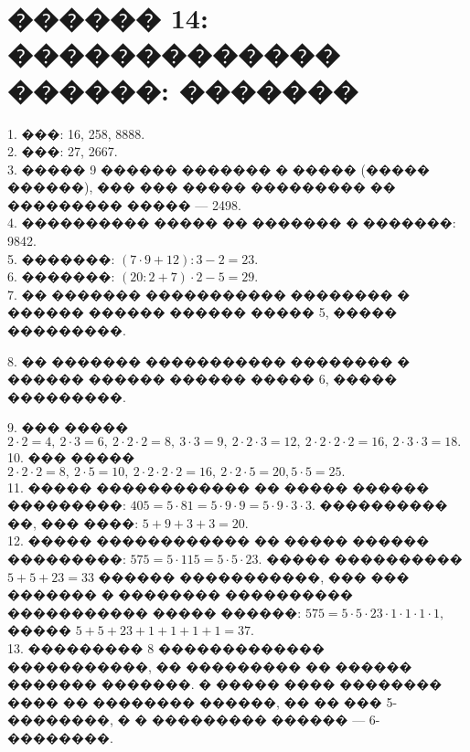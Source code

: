 \documentclass[12pt]{article}
\begin{document}
\section{������ 14: ������������� ������: �������}
1. ���: 16, 258, 8888.\\
2. ���: 27, 2667.\\
3. ����� 9 ������ ������� � ����� (����� ������), ��� ��� ����� ��������� �� ��������� ����� --- 2498.\\
4. ���������� ����� �� ������� � �������: 9842.\\
5. �������: $(7\cdot9+12):3-2=23.$\\
6. �������: $(20:2+7)\cdot2-5=29.$\\
7. �� ������� ����������� �������� � ������ ������ ������ ����� 5, ����� ���������.
\begin{center}
\begin{figure}[h!]
\end{figure}
\end{center}
8. �� ������� ����������� �������� � ������ ������ ������ ����� 6, ����� ���������.
\begin{center}
\begin{figure}[h!]
\end{figure}
\end{center}
9. ��� ����� $2\cdot2=4,\ 2\cdot3=6,\ 2\cdot2\cdot2=8,\ 3\cdot3=9,\ 2\cdot2\cdot3=12,\ 2\cdot2\cdot2\cdot2=16,\ 2\cdot3\cdot3=18.$\\
10. ��� ����� $2\cdot2\cdot2=8,\ 2\cdot5=10,\ 2\cdot2\cdot2\cdot2=16,\ 2\cdot2\cdot5=20, 5\cdot5=25.$\\
11. ����� ������������ �� ����� ������ ���������: $405=5\cdot81=5\cdot9\cdot9=5\cdot9\cdot3\cdot3.$ ���������� ��, ��� ����: $5+9+3+3=20.$\\
12. ����� ������������ �� ����� ������ ���������: $575=5\cdot115=5\cdot5\cdot23.$ ����� ���������� $5+5+23=33$ ������ �����������, ��� ��� ������� � �������� ���������� ����������� ����� ������: $575=5\cdot5\cdot23\cdot1\cdot1\cdot1\cdot1,$ ����� $5+5+23+1+1+1+1=37.$\\
13. ��������� 8 ������������� �����������, �� ��������� �� ������ ������� �������. � ����� ���� �������� ���� �� �������� ������, �� �� ��� 5-��������, � � ��������� ������ --- 6-��������.
\begin{center}
\begin{figure}[h!]
\end{figure}
\end{center}
\end{document}
